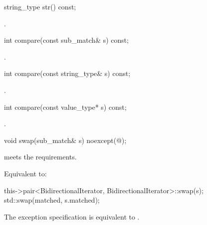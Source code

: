 %
\begin{itemdecl}
string_type str() const;
\end{itemdecl}

\begin{itemdescr}
\pnum
\returns
{}.
\end{itemdescr}

%
\begin{itemdecl}
int compare(const sub_match& s) const;
\end{itemdecl}

\begin{itemdescr}
\pnum
\returns
{}.
\end{itemdescr}

%
\begin{itemdecl}
int compare(const string_type& s) const;
\end{itemdecl}

\begin{itemdescr}
\pnum
\returns
{}.
\end{itemdescr}

%
\begin{itemdecl}
int compare(const value_type* s) const;
\end{itemdecl}

\begin{itemdescr}
\pnum
\returns
{}.
\end{itemdescr}

%
\begin{itemdecl}
void swap(sub_match& s) noexcept(@\seebelow@);
\end{itemdecl}

\begin{itemdescr}
\pnum
\expects
{} meets
the  requirements.

\pnum
\effects
Equivalent to:
\begin{codeblock}
this->pair<BidirectionalIterator, BidirectionalIterator>::swap(s);
std::swap(matched, s.matched);
\end{codeblock}

\pnum
\remarks
The exception specification is equivalent to
.
\end{itemdescr}

